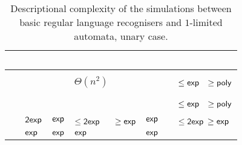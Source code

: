 \begin{table}
	\centering
	\renewcommand{\arraystretch}{1.2}
	\renewcommand{\hstdef}{.55}
	\begin{tabular}{|l|l|l|p{4.3em}|l|l|p{3.1em}|}
		\hline
		~     & \ODFA           & \ONFA           & \TDFA                                            & \TNFA   & \OLA   & \ODLA                          \\ \hline
		\ODFA & \cY             & \Ctriv          & \Ctriv                                           & \Ctriv  & \Ctriv & \Ctriv                         \\ \hline
		\ONFA & \rbt{$\CsubEq$} & \cY             & \cR $\Theta(n^2)$                                & \Ctriv  & \Ctriv & \cB $\le\Cexp\hst$ $\ge\Cpoly$ \\ \hline
		\TDFA & \rbt{$\CsubEq$} & \rbt{$\CsubEq$} & \cY                                              & \Ctriv  & \Ctriv & \Ctriv                         \\ \hline
		\TNFA & \rbt{$\CsubEq$} & \rbt{$\CsubEq$} & \cR \rbt[.4]{$\le\Csubln$} \rbt[.3]{$\ge\Cpoly$} & \cY     & \Ctriv & \cB $\le\Cexp\hst$ $\ge\Cpoly$ \\ \hline
		\OLA  & $\Cdexp$        & $\Cexp$         & \cG $\le\Cdexp\hst[1.25]$ $\ge\Cexp$             & $\Cexp$ & \cY    & \cG $\le\Cdexp$ $\ge\Cexp$     \\ \hline
		\ODLA & $\Cexp$         & $\Cexp$         & $\Cexp$                                          & $\Cexp$ & \Ctriv & \cY                            \\ \hline
	\end{tabular}
	\caption{Descriptional complexity of the simulations between basic regular language recognisers and $1$-limited automata, unary case.}
\end{table}

